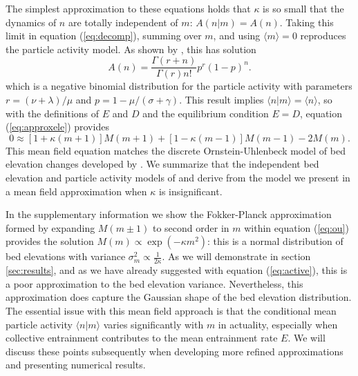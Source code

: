 \documentclass[draft]{agujournal2018}
\begin{document}
The simplest approximation to these equations holds that $\kappa$ is so small that the dynamics of $n$ are totally independent of $m$: $A(n|m) = A(n)$. Taking this limit in equation (\ref{eq:decomp}), summing over $m$, and using $\langle m \rangle = 0$ reproduces the \citet{Ancey2008} particle activity model.
As shown by \citet{Ancey2008}, this has solution
\begin{equation} A(n) = \frac{\Gamma(r+n)}{\Gamma(r)n!}p^r(1-p)^n.\label{eq:ancey}\end{equation}
which is a negative binomial distribution for the particle activity with parameters $r=(\nu+\lambda)/\mu$ and $p=1-\mu/(\sigma+\gamma).$
This result implies $\langle n | m \rangle = \langle n \rangle$, so with the definitions of $E$ and $D$ and the equilibrium condition $E=D$, equation (\ref{eq:approxele}) provides
\begin{equation}0 \approx [1+\kappa(m+1)]M(m+1) + [1-\kappa(m-1)]M(m-1)-2M(m). \label{eq:ou} \end{equation}
This mean field equation matches the discrete Ornstein-Uhlenbeck model of bed elevation changes developed by \citet{Martin2014}.
We summarize that the independent bed elevation and particle activity models of \citet{Martin2014} and \citet{Ancey2008} derive from the model we present in a mean field approximation when $\kappa$ is insignificant.

In the supplementary information we show the Fokker-Planck approximation \citep{Gardiner1983} formed by expanding $M(m\pm 1)$ to second order in $m$ within equation (\ref{eq:ou}) provides the solution $M(m) \propto \exp(-\kappa m^2)$: this is a normal distribution of bed elevations with variance $\sigma_m^2 \propto \frac{1}{2\kappa}$.
As we will demonstrate in section \ref{sec:results}, and as we have already suggested with equation (\ref{eq:active}), this is a poor approximation to the bed elevation variance. Nevertheless, this approximation does capture the Gaussian shape of the bed elevation distribution.
The essential issue with this mean field approach is that the conditional mean particle activity $\langle n | m \rangle$ varies significantly with $m$ in actuality, especially when collective entrainment contributes to the mean entrainment rate $E$. We will discuss these points subsequently when developing more refined approximations and presenting numerical results.
\end{document}
